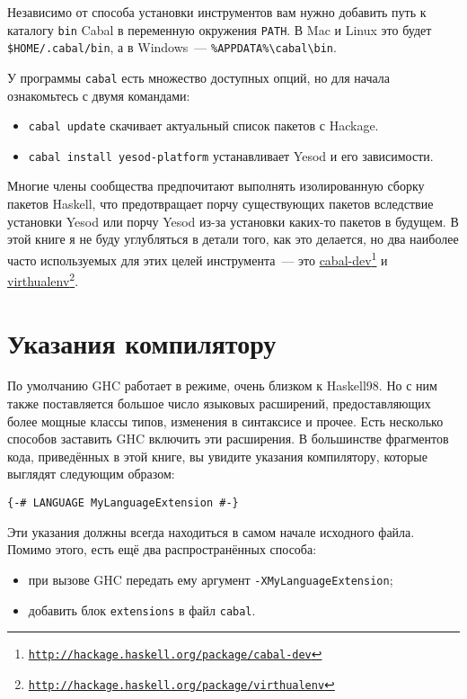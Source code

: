 Независимо от способа установки инструментов вам нужно добавить путь к каталогу \texttt{bin} Cabal в переменную окружения \texttt{PATH}. В Mac и Linux это будет \texttt{\$HOME/.cabal/bin}, а в Windows~--- \texttt{\%APPDATA\%\textbackslash{}cabal\textbackslash{}bin}.

У программы \texttt{cabal} есть множество доступных опций, но для начала ознакомьтесь с двумя командами:

\begin{itemize}
  \item \texttt{cabal update} скачивает актуальный список пакетов с Hackage.
  \item \texttt{cabal install yesod-platform} устанавливает Yesod и его зависимости.
\end{itemize}

\begin{remark}
Многие члены сообщества предпочитают выполнять изолированную сборку пакетов Haskell, что предотвращает порчу существующих пакетов вследствие установки Yesod или порчу Yesod из-за установки каких-то пакетов в будущем. В этой книге я не буду углубляться в детали того, как это делается, но два наиболее часто используемых для этих целей инструмента~--- это \href{http://hackage.haskell.org/package/cabal-dev}{cabal-dev}\footnote{\href{http://hackage.haskell.org/package/cabal-dev}{\texttt{http://hackage.haskell.org/package/cabal-dev}}} и \href{http://hackage.haskell.org/package/virthualenv}{virthualenv}\footnote{\href{http://hackage.haskell.org/package/virthualenv}{\texttt{http://hackage.haskell.org/package/virthualenv}}}.
\end{remark}

\section{Указания компилятору}

По умолчанию GHC работает в режиме, очень близком к Haskell98. Но с ним также поставляется большое число языковых расширений, предоставляющих более мощные классы типов, изменения в синтаксисе и прочее. Есть несколько способов заставить GHC включить эти расширения. В большинстве фрагментов кода, приведённых в этой книге, вы увидите указания компилятору, которые выглядят следующим образом:

\begin{lstlisting}
{-# LANGUAGE MyLanguageExtension #-}
\end{lstlisting}

Эти указания должны всегда находиться в самом начале исходного файла. Помимо этого, есть ещё два распространённых способа:
\begin{itemize}
\item при вызове GHC передать ему аргумент \lstinline'-XMyLanguageExtension';
\item добавить блок \texttt{extensions} в файл \texttt{cabal}.
\end{itemize}

